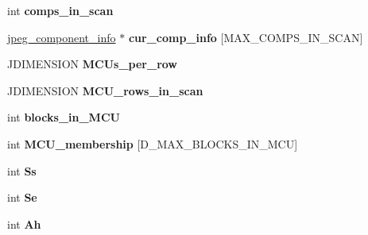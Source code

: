 \begin{DoxyCompactItemize}
\item 
int {\bfseries comps\+\_\+in\+\_\+scan}\hypertarget{structjpeg__decompress__struct_a2a28db865b9d49bfa9bc6335abf331c3}{}\label{structjpeg__decompress__struct_a2a28db865b9d49bfa9bc6335abf331c3}

\item 
\hyperlink{structjpeg__component__info}{jpeg\+\_\+component\+\_\+info} $\ast$ {\bfseries cur\+\_\+comp\+\_\+info} \mbox{[}M\+A\+X\+\_\+\+C\+O\+M\+P\+S\+\_\+\+I\+N\+\_\+\+S\+C\+AN\mbox{]}\hypertarget{structjpeg__decompress__struct_ab640afe8fb70108caed0c2520aab0c2a}{}\label{structjpeg__decompress__struct_ab640afe8fb70108caed0c2520aab0c2a}

\item 
J\+D\+I\+M\+E\+N\+S\+I\+ON {\bfseries M\+C\+Us\+\_\+per\+\_\+row}\hypertarget{structjpeg__decompress__struct_aafebfaa0046cc8b449ce2401c174697f}{}\label{structjpeg__decompress__struct_aafebfaa0046cc8b449ce2401c174697f}

\item 
J\+D\+I\+M\+E\+N\+S\+I\+ON {\bfseries M\+C\+U\+\_\+rows\+\_\+in\+\_\+scan}\hypertarget{structjpeg__decompress__struct_a6d1110064a4f2fbc46a8831fd148bca6}{}\label{structjpeg__decompress__struct_a6d1110064a4f2fbc46a8831fd148bca6}

\item 
int {\bfseries blocks\+\_\+in\+\_\+\+M\+CU}\hypertarget{structjpeg__decompress__struct_a76d2872b589796cb8d66428e660e37fb}{}\label{structjpeg__decompress__struct_a76d2872b589796cb8d66428e660e37fb}

\item 
int {\bfseries M\+C\+U\+\_\+membership} \mbox{[}D\+\_\+\+M\+A\+X\+\_\+\+B\+L\+O\+C\+K\+S\+\_\+\+I\+N\+\_\+\+M\+CU\mbox{]}\hypertarget{structjpeg__decompress__struct_abcd46ef2fd7c068bdbdcde43efbd786e}{}\label{structjpeg__decompress__struct_abcd46ef2fd7c068bdbdcde43efbd786e}

\item 
int {\bfseries Ss}\hypertarget{structjpeg__decompress__struct_a61133b3e8959b3ab4ead2b6e12761176}{}\label{structjpeg__decompress__struct_a61133b3e8959b3ab4ead2b6e12761176}

\item 
int {\bfseries Se}\hypertarget{structjpeg__decompress__struct_a978242a8eb6c75dbb86e8382470b2290}{}\label{structjpeg__decompress__struct_a978242a8eb6c75dbb86e8382470b2290}

\item 
int {\bfseries Ah}\hypertarget{structjpeg__decompress__struct_a2df559c55319d0c785b91e95960bea55}{}\label{structjpeg__decompress__struct_a2df559c55319d0c785b91e95960bea55}


\end{DoxyCompactItemize}
